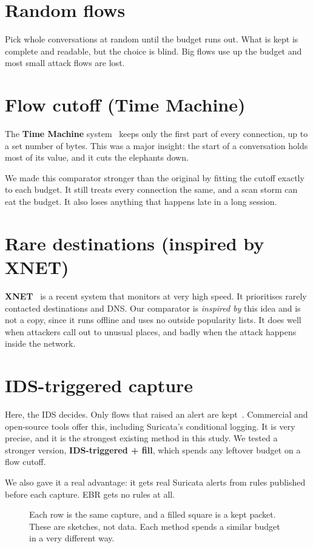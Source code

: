 \section{Random flows}
Pick whole conversations at random until the budget runs out. What is kept is complete and readable, but the choice is blind. Big flows use up the budget and most small attack flows are lost.

\section{Flow cutoff (Time Machine)}
The \textbf{Time Machine} system~\cite{timemachine,timetravel} keeps only the first part of every connection, up to a set number of bytes. This was a major insight: the start of a conversation holds most of its value, and it cuts the elephants down.

We made this comparator stronger than the original by fitting the cutoff exactly to each budget. It still treats every connection the same, and a scan storm can eat the budget. It also loses anything that happens late in a long session.

\section{Rare destinations (inspired by XNET)}
\textbf{XNET}~\cite{xnet} is a recent system that monitors at very high speed. It prioritises rarely contacted destinations and DNS. Our comparator is \emph{inspired by} this idea and is not a copy, since it runs offline and uses no outside popularity lists. It does well when attackers call out to unusual places, and badly when the attack happens inside the network.

\section{IDS-triggered capture}
Here, the IDS decides. Only flows that raised an alert are kept~\cite{sanspcap}. Commercial and open-source tools offer this, including Suricata's conditional logging. It is very precise, and it is the strongest existing method in this study. We tested a stronger version, \textbf{IDS-triggered + fill}, which spends any leftover budget on a flow cutoff.

We also gave it a real advantage: it gets real Suricata alerts from rules published before each capture. EBR gets no rules at all.

\begin{figure}[H]
\centering
{}
\caption{Each row is the same capture, and a filled square is a kept packet. These are sketches, not data. Each method spends a similar budget in a very different way.}
\end{figure}

